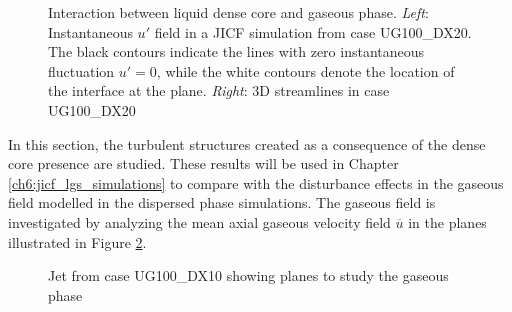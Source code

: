\begin{figure}[ht]
\flushleft
{}
\caption[Interaction between liquid dense core and gaseous phase.]{Interaction between liquid dense core and gaseous phase. \textsl{Left}: Instantaneous $u'$ field in a JICF simulation from case UG100\_DX20. The black contours indicate the lines with zero instantaneous fluctuation $u' = 0$, while the white contours denote the location of the interface at the plane. \textsl{Right}: 3D streamlines in case UG100\_DX20}
\label{fig:jet_air_interaction_up_and_skeleton}
\end{figure}


In this section, the turbulent structures created as a consequence of the dense core presence are studied. These results will be used in Chapter \ref{ch6:jicf_lgs_simulations} to compare with the disturbance effects in the gaseous field modelled in the dispersed phase simulations. The gaseous field is investigated by analyzing the mean axial gaseous velocity field $\overline{u}$ in the planes illustrated in Figure \ref{fig:jicf_sps_with_gaseous_planes}. %


\begin{figure}[h!]
	\centering
	\caption{Jet from case UG100\_DX10 showing planes to study the gaseous phase}
	\label{fig:jicf_sps_with_gaseous_planes}
\end{figure}


